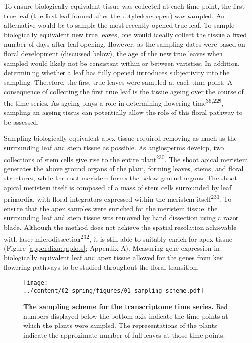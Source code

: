 \documentclass[12pt,]{book}
\begin{document}
To ensure biologically equivalent tissue was collected at each time
point, the first true leaf (the first leaf formed after the cotyledons
open) was sampled. An alternative would be to sample the most recently
opened true leaf. To sample biologically equivalent new true leaves, one
would ideally collect the tissue a fixed number of days after leaf
opening. However, as the sampling dates were based on floral development
(discussed below), the age of the new true leaves when sampled would
likely not be consistent within or between varieties. In addition,
determining whether a leaf has fully opened introduces subjectivity into
the sampling. Therefore, the first true leaves were sampled at each time
point. A consequence of collecting the first true leaf is the tissue
ageing over the course of the time series. As ageing plays a role in
determining flowering time\textsuperscript{36,229}, sampling an ageing
tissue can potentially allow the role of this floral pathway to be
assessed.

Sampling biologically equivalent apex tissue required removing as much
as the surrounding leaf and stem tissue as possible. As angiosperms
develop, two collections of stem cells give rise to the entire
plant\textsuperscript{230}. The shoot apical meristem generates the
above ground organs of the plant, forming leaves, stems, and floral
structures, while the root meristem forms the below ground organs. The
shoot apical meristem itself is composed of a mass of stem cells
surrounded by leaf primordia, with floral integrators expressed within
the meristem itself\textsuperscript{231}. To ensure that the apex
samples were enriched for the meristem tissue, the surrounding leaf and
stem tissue was removed by hand dissection using a razor blade. Although
the method does not achieve the spatial resolution achievable with laser
microdissection\textsuperscript{232}, it is still able to suitably
enrich for apex tissue (Figure \ref{appendixa:qaplots}; Appendix A).
Measuring gene expression in biologically equivalent leaf and apex
tissue allowed for the genes from key flowering pathways to be studied
throughout the floral transition.

\begin{figure}[htbp]
\centering
\texttt{[image: ../content/02\_spring/figures/01\_sampling\_scheme.pdf]}
\caption{\textbf{The sampling scheme for the transcriptome time series.}
Red numbers displayed below the bottom axis indicate the time points at
which the plants were sampled. The representations of the plants
indicate the approximate number of full leaves at those time
points.}\label{figure:201:samplingscheme}
\end{figure}
\end{document}
